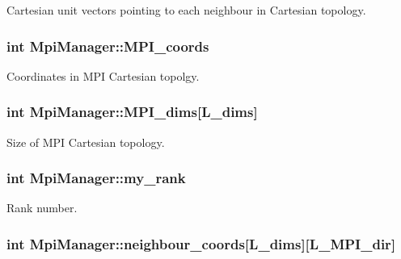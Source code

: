 Cartesian unit vectors pointing to each neighbour in Cartesian topology. 

\subsubsection[{\texorpdfstring{M\+P\+I\+\_\+coords}{MPI_coords}}]{\setlength{\rightskip}{0pt plus 5cm}int Mpi\+Manager\+::\+M\+P\+I\+\_\+coords\hspace{0.3cm}{\ttfamily [static]}}\hypertarget{class_mpi_manager_a677a39e98470d3945248a66cf0bc3ec3}{}\label{class_mpi_manager_a677a39e98470d3945248a66cf0bc3ec3}


Coordinates in M\+PI Cartesian topolgy. 

\subsubsection[{\texorpdfstring{M\+P\+I\+\_\+dims}{MPI_dims}}]{\setlength{\rightskip}{0pt plus 5cm}int Mpi\+Manager\+::\+M\+P\+I\+\_\+dims\mbox{[}{\bf L\+\_\+dims}\mbox{]}}\hypertarget{class_mpi_manager_a8e2e923e656c338148d42517323c9586}{}\label{class_mpi_manager_a8e2e923e656c338148d42517323c9586}


Size of M\+PI Cartesian topology. 

\subsubsection[{\texorpdfstring{my\+\_\+rank}{my_rank}}]{\setlength{\rightskip}{0pt plus 5cm}int Mpi\+Manager\+::my\+\_\+rank\hspace{0.3cm}{\ttfamily [static]}}\hypertarget{class_mpi_manager_a8329212abc23e5fa3e32e961b7823b5b}{}\label{class_mpi_manager_a8329212abc23e5fa3e32e961b7823b5b}


Rank number. 

\subsubsection[{\texorpdfstring{neighbour\+\_\+coords}{neighbour_coords}}]{\setlength{\rightskip}{0pt plus 5cm}int Mpi\+Manager\+::neighbour\+\_\+coords\mbox{[}{\bf L\+\_\+dims}\mbox{]}\mbox{[}{\bf L\+\_\+\+M\+P\+I\+\_\+dir}\mbox{]}}\hypertarget{class_mpi_manager_a6db3764ecc637f90afded1f783acb244}{}\label{class_mpi_manager_a6db3764ecc637f90afded1f783acb244}


